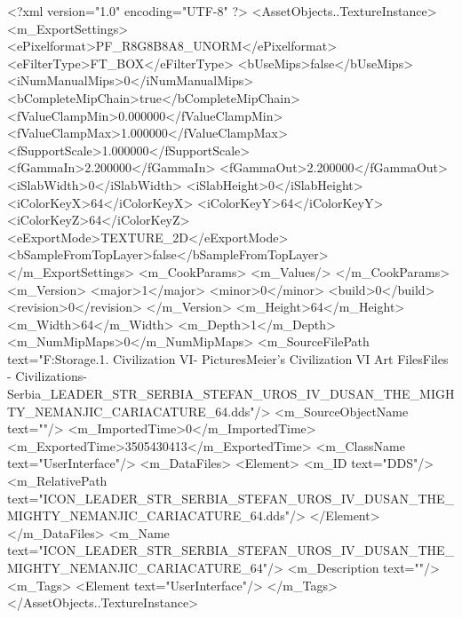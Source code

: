 <?xml version="1.0" encoding="UTF-8" ?>
<AssetObjects..TextureInstance>
	<m_ExportSettings>
		<ePixelformat>PF_R8G8B8A8_UNORM</ePixelformat>
		<eFilterType>FT_BOX</eFilterType>
		<bUseMips>false</bUseMips>
		<iNumManualMips>0</iNumManualMips>
		<bCompleteMipChain>true</bCompleteMipChain>
		<fValueClampMin>0.000000</fValueClampMin>
		<fValueClampMax>1.000000</fValueClampMax>
		<fSupportScale>1.000000</fSupportScale>
		<fGammaIn>2.200000</fGammaIn>
		<fGammaOut>2.200000</fGammaOut>
		<iSlabWidth>0</iSlabWidth>
		<iSlabHeight>0</iSlabHeight>
		<iColorKeyX>64</iColorKeyX>
		<iColorKeyY>64</iColorKeyY>
		<iColorKeyZ>64</iColorKeyZ>
		<eExportMode>TEXTURE_2D</eExportMode>
		<bSampleFromTopLayer>false</bSampleFromTopLayer>
	</m_ExportSettings>
	<m_CookParams>
		<m_Values/>
	</m_CookParams>
	<m_Version>
		<major>1</major>
		<minor>0</minor>
		<build>0</build>
		<revision>0</revision>
	</m_Version>
	<m_Height>64</m_Height>
	<m_Width>64</m_Width>
	<m_Depth>1</m_Depth>
	<m_NumMipMaps>0</m_NumMipMaps>
	<m_SourceFilePath text="F:\Mod Storage\2.1. Civilization VI\Mods\Archive - Pictures\Sid Meier's Civilization VI Art Files\Art Files - Civilizations\Civilization - Serbia\ICON_LEADER_STR_SERBIA_STEFAN_UROS_IV_DUSAN_THE_MIGHTY_NEMANJIC_CARIACATURE_64.dds"/>
	<m_SourceObjectName text=""/>
	<m_ImportedTime>0</m_ImportedTime>
	<m_ExportedTime>3505430413</m_ExportedTime>
	<m_ClassName text="UserInterface"/>
	<m_DataFiles>
		<Element>
			<m_ID text="DDS"/>
			<m_RelativePath text="ICON_LEADER_STR_SERBIA_STEFAN_UROS_IV_DUSAN_THE_MIGHTY_NEMANJIC_CARIACATURE_64.dds"/>
		</Element>
	</m_DataFiles>
	<m_Name text="ICON_LEADER_STR_SERBIA_STEFAN_UROS_IV_DUSAN_THE_MIGHTY_NEMANJIC_CARIACATURE_64"/>
	<m_Description text=""/>
	<m_Tags>
		<Element text="UserInterface"/>
	</m_Tags>
</AssetObjects..TextureInstance>

